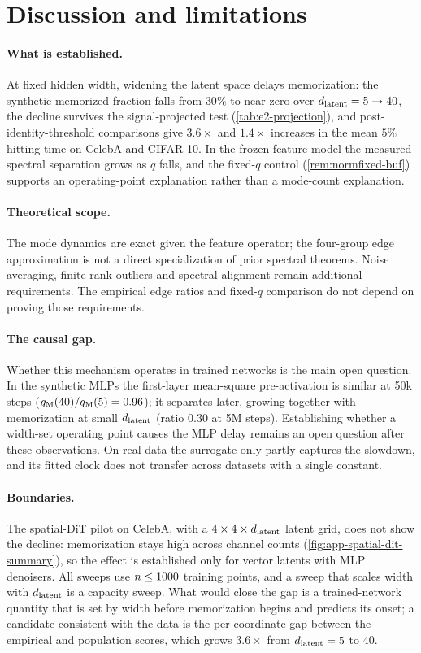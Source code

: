 \section{Discussion and limitations}
\label{sec:discussion}

\paragraph{What is established.}
At fixed hidden width, widening the latent space delays memorization: the synthetic memorized fraction falls from $30\%$ to near zero over $d_{\mathrm{latent}}=5\to40$, the decline survives the signal-projected test (\cref{tab:e2-projection}), and post-identity-threshold comparisons give $3.6\times$ and $1.4\times$ increases in the mean $5\%$ hitting time on CelebA and CIFAR-10. In the frozen-feature model the measured spectral separation grows as $q$ falls, and the fixed-$q$ control (\cref{rem:normfixed-buf}) supports an operating-point explanation rather than a mode-count explanation.

\paragraph{Theoretical scope.}
The mode dynamics are exact given the feature operator; the four-group edge approximation is not a direct specialization of prior spectral theorems. Noise averaging, finite-rank outliers and spectral alignment remain additional requirements. The empirical edge ratios and fixed-$q$ comparison do not depend on proving those requirements.

\paragraph{The causal gap.}
Whether this mechanism operates in trained networks is the main open question. In the synthetic MLPs the first-layer mean-square pre-activation is similar at 50k steps ($q_{\rm M}(40)/q_{\rm M}(5)=0.96$); it separates later, growing together with memorization at small $d_{\mathrm{latent}}$ (ratio $0.30$ at 5M steps). Establishing whether a width-set operating point causes the MLP delay remains an open question after these observations. On real data the surrogate only partly captures the slowdown, and its fitted clock does not transfer across datasets with a single constant.

\paragraph{Boundaries.}
The spatial-DiT pilot on CelebA, with a $4\times4\times d_{\mathrm{latent}}$ latent grid, does not show the decline: memorization stays high across channel counts (\cref{fig:app-spatial-dit-summary}), so the effect is established only for vector latents with MLP denoisers. All sweeps use $n\le1000$ training points, and a sweep that scales width with $d_{\mathrm{latent}}$ is a capacity sweep. What would close the gap is a trained-network quantity that is set by width before memorization begins and predicts its onset; a candidate consistent with the data is the per-coordinate gap between the empirical and population scores, which grows $3.6\times$ from $d_{\mathrm{latent}}=5$ to $40$.
